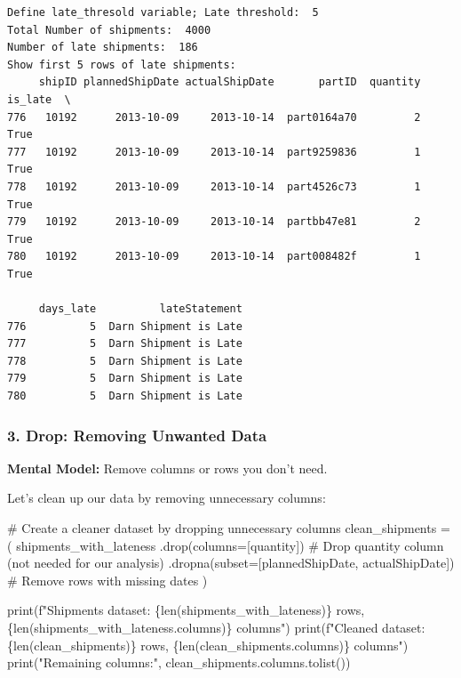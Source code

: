 \documentclass[
]{article}
\newenvironment{Shaded}{\begin{snugshade}}{\end{snugshade}}
\newcommand{\BuiltInTok}[1]{\textcolor[rgb]{0.00,0.23,0.31}{#1}}
\newcommand{\CommentTok}[1]{\textcolor[rgb]{0.37,0.37,0.37}{#1}}
\newcommand{\NormalTok}[1]{\textcolor[rgb]{0.00,0.23,0.31}{#1}}
\newcommand{\OperatorTok}[1]{\textcolor[rgb]{0.37,0.37,0.37}{#1}}
\newcommand{\SpecialCharTok}[1]{\textcolor[rgb]{0.37,0.37,0.37}{#1}}
\newcommand{\SpecialStringTok}[1]{\textcolor[rgb]{0.13,0.47,0.30}{#1}}
\newcommand{\StringTok}[1]{\textcolor[rgb]{0.13,0.47,0.30}{#1}}
\begin{document}
\begin{verbatim}
Define late_thresold variable; Late threshold:  5
Total Number of shipments:  4000
Number of late shipments:  186
Show first 5 rows of late shipments: 
     shipID plannedShipDate actualShipDate       partID  quantity  is_late  \
776   10192      2013-10-09     2013-10-14  part0164a70         2     True   
777   10192      2013-10-09     2013-10-14  part9259836         1     True   
778   10192      2013-10-09     2013-10-14  part4526c73         1     True   
779   10192      2013-10-09     2013-10-14  partbb47e81         2     True   
780   10192      2013-10-09     2013-10-14  part008482f         1     True   

     days_late          lateStatement  
776          5  Darn Shipment is Late  
777          5  Darn Shipment is Late  
778          5  Darn Shipment is Late  
779          5  Darn Shipment is Late  
780          5  Darn Shipment is Late  
\end{verbatim}

\subsubsection{3. Drop: Removing Unwanted
Data}\label{drop-removing-unwanted-data}

\textbf{Mental Model:} Remove columns or rows you don't need.

Let's clean up our data by removing unnecessary columns:

\label{mental-model-3-drop}
\begin{Shaded}
\begin{Highlighting}[]
\CommentTok{\# Create a cleaner dataset by dropping unnecessary columns}
\NormalTok{clean\_shipments }\OperatorTok{=}\NormalTok{ (}
\NormalTok{    shipments\_with\_lateness}
\NormalTok{    .drop(columns}\OperatorTok{=}\NormalTok{[}\StringTok{\textquotesingle{}quantity\textquotesingle{}}\NormalTok{])  }\CommentTok{\# Drop quantity column (not needed for our analysis)}
\NormalTok{    .dropna(subset}\OperatorTok{=}\NormalTok{[}\StringTok{\textquotesingle{}plannedShipDate\textquotesingle{}}\NormalTok{, }\StringTok{\textquotesingle{}actualShipDate\textquotesingle{}}\NormalTok{])  }\CommentTok{\# Remove rows with missing dates}
\NormalTok{)}

\BuiltInTok{print}\NormalTok{(}\SpecialStringTok{f"Shipments dataset: }\SpecialCharTok{\{}\BuiltInTok{len}\NormalTok{(shipments\_with\_lateness)}\SpecialCharTok{\}}\SpecialStringTok{ rows, }\SpecialCharTok{\{}\BuiltInTok{len}\NormalTok{(shipments\_with\_lateness.columns)}\SpecialCharTok{\}}\SpecialStringTok{ columns"}\NormalTok{)}
\BuiltInTok{print}\NormalTok{(}\SpecialStringTok{f"Cleaned dataset: }\SpecialCharTok{\{}\BuiltInTok{len}\NormalTok{(clean\_shipments)}\SpecialCharTok{\}}\SpecialStringTok{ rows, }\SpecialCharTok{\{}\BuiltInTok{len}\NormalTok{(clean\_shipments.columns)}\SpecialCharTok{\}}\SpecialStringTok{ columns"}\NormalTok{)}
\BuiltInTok{print}\NormalTok{(}\StringTok{"Remaining columns:"}\NormalTok{, clean\_shipments.columns.tolist())}
\end{Highlighting}
\end{Shaded}
\end{document}
